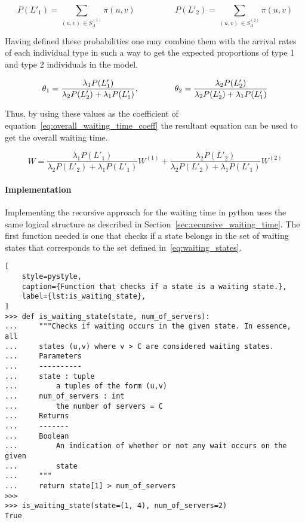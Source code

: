\begin{equation*}
    P(L'_1) = \sum_{(u,v) \, \in S_A^{(1)}} \pi(u,v) \hspace{2cm}
    P(L'_2) = \sum_{(u,v) \, \in S_A^{(2)}} \pi(u,v)
\end{equation*}


Having defined these probabilities one may combine them with the arrival rates
of each individual type in such a way to get the expected proportions of type 1
and type 2 individuals in the model.

\begin{equation}
    \theta_1 = \frac{\lambda_1 P(L'_1)}{\lambda_2 P(L'_2) + \lambda_1 P(L'_1)},
    \hspace{1.5cm}
    \theta_2 = \frac{\lambda_2 P(L'_2)}{\lambda_2 P(L'_2) + \lambda_1 P(L'_1)}
\end{equation}

Thus, by using these values as the coefficient of
equation~\eqref{eq:overall_waiting_time_coeff}
the resultant equation can be used to get the overall waiting time.

\begin{equation}\label{eq:overall_waiting_time}
    W = \frac{\lambda_1 P(L'_1)}{\lambda_2 P(L'_2) + \lambda_1 P(L'_1)} W^{(1)}
    + \frac{\lambda_2 P(L'_2)}{\lambda_2 P(L'_2) + \lambda_1 P(L'_1)} W^{(2)}
\end{equation}


\paragraph{Implementation}\label{sec:waiting_recursive_implementation}

Implementing the recursive approach for the waiting time in python uses the
same logical structure as described in Section~\ref{sec:recursive_waiting_time}.
The first function needed is one that checks if a state belongs in the
set of waiting states that corresponds to the set defined
in~\eqref{eq:waiting_states}.

\begin{lstlisting}[
    style=pystyle,
    caption={Function that checks if a state is a waiting state.},
    label={lst:is_waiting_state},
]
>>> def is_waiting_state(state, num_of_servers):
...     """Checks if waiting occurs in the given state. In essence, all
...     states (u,v) where v > C are considered waiting states.
...     Parameters
...     ----------
...     state : tuple
...         a tuples of the form (u,v)
...     num_of_servers : int
...         the number of servers = C
...     Returns
...     -------
...     Boolean
...         An indication of whether or not any wait occurs on the given
...         state
...     """
...     return state[1] > num_of_servers
>>>
>>> is_waiting_state(state=(1, 4), num_of_servers=2)
True

\end{lstlisting}

